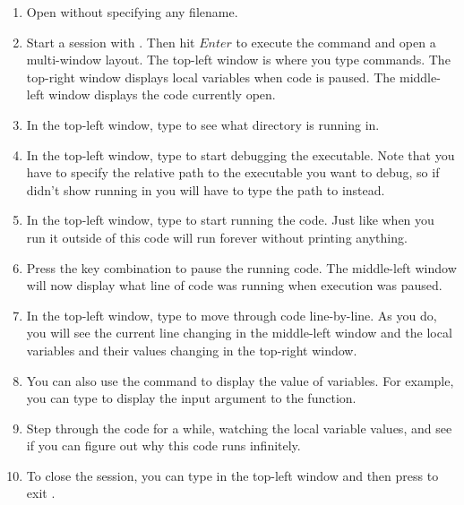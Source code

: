 \documentclass{tufte-handout}
\begin{document}
\begin{enumerate}
  \item Open  without specifying any filename.

  \item Start a  session with . Then hit
    $\mathit{Enter}$ to execute the command and open a multi-window layout. The
    top-left window is where you type commands. The top-right window displays
    local variables when code is paused. The middle-left window displays the code
    currently open.

  \item In the top-left window, type  to see what directory
     is running in.

  \item In the top-left window, type  to start
    debugging the  executable. Note that you have to specify
    the relative path to the executable you want to debug, so if 
    didn't show  running in  you will have to
    type the path to  instead.

  \item In the top-left window, type  to start running the code.
    Just like when you run it outside of  this code will run
    forever without printing anything.

  \item Press the key combination  to pause the running code.
    The middle-left window will now display what line of code was running when
    execution was paused.

  \item In the top-left window,
    type  to move through code line-by-line. As you do, you will
    see the current line changing in the middle-left window and the local
    variables and their values changing in the top-right window.

  \item You can also use the  command to display the value of
    variables. For example, you can type  to display the
    input argument to the function.

  \item Step through the code for a while, watching the local variable values,
    and see if you can figure out why this code runs infinitely.

  \item To close the  session, you can type  in
    the top-left window and then press  to exit
    .

\end{enumerate}
\end{document}
